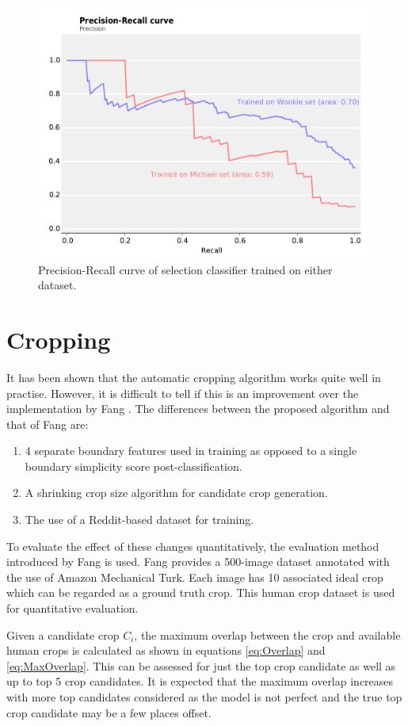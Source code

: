 \begin{figure}
\centering\includegraphics[width=0.8\columnwidth]{../figures/PRcurve.pdf}
\caption{Precision-Recall curve of selection classifier trained on either dataset.\label{fig:PR}}
\end{figure}


\section{Cropping}

It has been shown that the automatic cropping algorithm works quite well in
practise.
However, it is difficult to tell if this is an improvement over the
implementation by Fang \cite{fang2014automatic}.
The differences between the proposed algorithm and that of Fang are:

\begin{enumerate}
\item 4 separate boundary features used in training as opposed to a single
      boundary simplicity score post-classification.
\item A shrinking crop size algorithm for candidate crop generation.
\item The use of a Reddit-based dataset for training.
\end{enumerate}

To evaluate the effect of these changes quantitatively, the evaluation method
introduced by Fang is used.
Fang provides a 500-image dataset annotated with the use of Amazon Mechanical
Turk.
Each image has 10 associated ideal crop which can be regarded as a ground truth
crop.
This human crop dataset is used for quantitative evaluation.

Given a candidate crop $C_i$, the maximum overlap between the crop and available
human crops is calculated as shown in equations \ref{eq:Overlap} and \ref{eq:MaxOverlap}.
This can be assessed for just the top crop candidate as well as up to top 5 crop
candidates.
It is expected that the maximum overlap increases with more top candidates
considered as the model is not perfect and the true top crop candidate may be a
few places offset.

